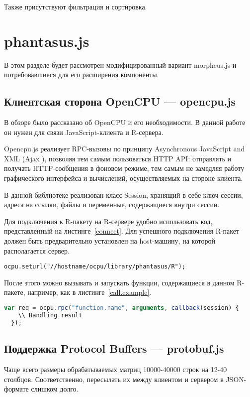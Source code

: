 \documentclass[annotation,specification]{itmo-student-thesis}
\begin{document}
Также присутствуют фильтрация и сортировка. 

\section{phantasus.js}
В этом разделе будет рассмотрен модифицированный вариант morpheus.js и потребовавшиеся для его расширения компоненты.
\subsection{Клиентская сторона OpenCPU --- opencpu.js}
В обзоре было рассказано об OpenCPU и его необходимости. В данной работе он нужен для связи JavaScript-клиента и R-сервера.

Opencpu.js реализует RPC-вызовы по принципу Asynchronous JavaScript and XML (Ajax  \cite{ajax}), позволяя тем самым пользоваться HTTP API: отправлять и получать HTTP-сообщения в фоновом режиме, тем самым не замедляя работу графического интерфейса и вычислений, осуществляемых на стороне клиента.

В данной библиотеке реализован класс Session, хранящий в себе ключ сессии, адреса на ссылки, файлы и переменные, содержащиеся внутри сессии.

Для подключения к R-пакету на R-сервере удобно использовать код, представленный на листинге~\ref{connect}. Для успешного подключения R-пакет должен быть предварительно установлен на host-машину, на которой располагается сервер. 

\begin{lstlisting}[float=!h,caption={Подключение к R-пакету},label={connect}]
  ocpu.seturl("//hostname/ocpu/library/phantasus/R");
\end{lstlisting}

После этого можно вызывать и запускать функции, содержащиеся в данном R-пакете, например, как в листинге~\ref{call.example}.

\begin{lstlisting}[float=!h,caption={Пример вызова R-функции из JavaScript},label={call.example},language=JavaScript]
  var req = ocpu.rpc("function.name", arguments, callback(session) {
    \\ Handling result
  });
\end{lstlisting}

\subsection{Поддержка Protocol Buffers --- protobuf.js}
Чаще всего размеры обрабатываемых матриц 10000-40000 строк на 12-40 столбцов. Соответственно, пересылать их между клиентом и сервером в JSON-формате слишком долго.
\end{document}
